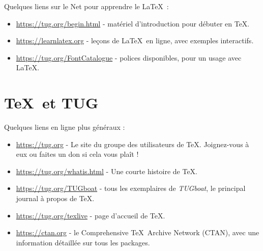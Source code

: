 \documentclass[11pt, oneside]{article}
\begin{document}
Quelques liens sur le Net pour apprendre le \LaTeX\ :

\begin{itemize}
\item \url{https://tug.org/begin.html} - matériel d'introduction pour débuter en \TeX.

\item \url{https://learnlatex.org} - leçons de \LaTeX\ en ligne, avec exemples interactifs.

\item \url{https://tug.org/FontCatalogue} - polices disponibles, pour un usage avec \LaTeX.

\end{itemize}


\section{\TeX\ et TUG}

Quelques liens en ligne plus généraux :

\begin{itemize}
	
\item \url{https://tug.org} - Le site du groupe des utilisateurs de \TeX. Joignez-vous à eux ou faites un don si cela vous plaît !

\item \url{https://tug.org/whatis.html} - Une courte histoire de \TeX.

\item \url{https://tug.org/TUGboat} - tous les exemplaires de \textsl{TUGboat},
le principal journal à propos de  \TeX.

\item \url{https://tug.org/texlive} - page d'accueil de \TeX.

\item \url{https://ctan.org} - le Comprehensive \TeX\ Archive Network
(CTAN), avec une information détaillée sur tous les packages.

\end{itemize}
\end{document}
